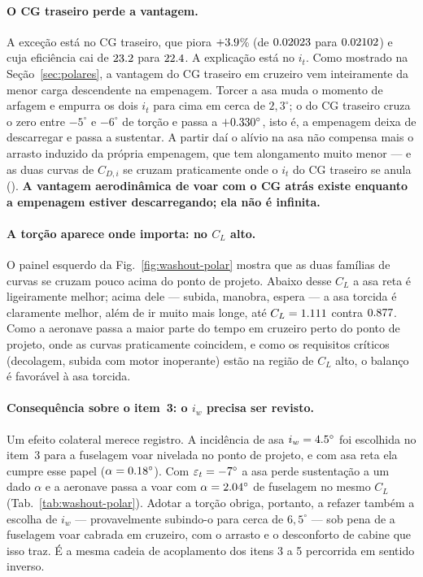 \paragraph{O CG traseiro perde a vantagem.}
A exceção está no CG traseiro, que piora $+3.9$\% (de
$0.02023$ para $0.02102$) e cuja eficiência cai de
$23.2$ para $22.4$. A explicação está no $i_t$. Como
mostrado na Seção~\ref{sec:polares}, a vantagem do CG traseiro em cruzeiro vem
inteiramente da menor carga descendente na empenagem. Torcer a asa muda o
momento de arfagem e empurra os dois $i_t$ para cima em cerca de
$2{,}3^\circ$; o do CG traseiro cruza o zero entre $-5^\circ$ e $-6^\circ$ de
torção e passa a $+0.330^\circ$, isto é, a empenagem deixa de descarregar
e passa a sustentar. A partir daí o alívio na asa não compensa mais o arrasto
induzido da própria empenagem, que tem alongamento muito menor --- e as duas
curvas de $C_{D,i}$ se cruzam praticamente onde o $i_t$ do CG traseiro se anula
(). \textbf{A vantagem aerodinâmica
de voar com o CG atrás existe enquanto a empenagem estiver descarregando; ela
não é infinita.}

\paragraph{A torção aparece onde importa: no $C_L$ alto.}
O painel esquerdo da Fig.~\ref{fig:washout-polar} mostra que as duas famílias
de curvas se cruzam pouco acima do ponto de projeto. Abaixo desse $C_L$ a asa
reta é ligeiramente melhor; acima dele --- subida, manobra, espera --- a asa
torcida é claramente melhor, além de ir muito mais longe, até
$C_L = 1.111$ contra $0.877$. Como a aeronave passa a
maior parte do tempo em cruzeiro perto do ponto de projeto, onde as curvas
praticamente coincidem, e como os requisitos críticos (decolagem, subida com
motor inoperante) estão na região de $C_L$ alto, o balanço é favorável à asa
torcida.

\paragraph{Consequência sobre o item~3: o $i_w$ precisa ser revisto.}
Um efeito colateral merece registro. A incidência de asa $i_w = 4.5^\circ$ foi
escolhida no item~3 para a fuselagem voar nivelada no ponto de projeto, e com
asa reta ela cumpre esse papel ($\alpha = 0.18^\circ$). Com
$\varepsilon_t = -7^\circ$ a asa perde sustentação a um dado $\alpha$ e a
aeronave passa a voar com $\alpha = 2.04^\circ$ de fuselagem no
mesmo $C_L$ (Tab.~\ref{tab:washout-polar}). Adotar a torção obriga, portanto, a
refazer também a escolha de $i_w$ --- provavelmente subindo-o para cerca de
$6{,}5^\circ$ --- sob pena de a fuselagem voar cabrada em cruzeiro, com o
arrasto e o desconforto de cabine que isso traz. É a mesma cadeia de
acoplamento dos itens 3 a 5 percorrida em sentido inverso.

